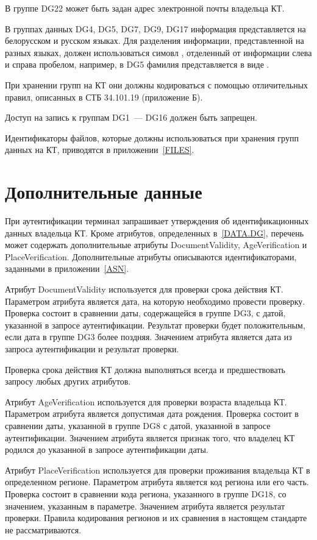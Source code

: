 В группе DG22 может быть задан адрес электронной 
почты владельца КТ. 

В группах данных DG4, DG5, DG7, DG9, DG17 информация
представляется на белорусском и русском языках.
Для разделения информации, представленной на разных языках,
должен использоваться симовл \str{/}, отделенный от информации 
слева и справа пробелом, например, в DG5 фамилия 
представляется в виде .

При хранении групп на КТ они должны кодироваться с помощью отличительных 
правил, описанных в СТБ 34.101.19 (приложение Б). 

Доступ на запись к группам DG1~--- DG16 должен быть запрещен.
 
Идентификаторы файлов, которые
должны использоваться при хранения групп данных на КТ,
приводятся в приложении~\ref{FILES}.

\section{Дополнительные данные}\label{DATA.Optional}

При аутентификации терминал запрашивает утверждения об идентификационных
данных владельца КТ. Кроме атрибутов, определенных в~\ref{DATA.DG}, 
перечень может содержать дополнительные атрибуты DocumentValidity, 
AgeVerification и PlaceVerification. Дополнительные атрибуты описываются 
идентификаторами, заданными в приложении~\ref{ASN}. 

Атрибут DocumentValidity используется для проверки срока действия КТ. 
Параметром атрибута является дата, на которую необходимо провести 
проверку. Проверка состоит в сравнении даты, содержащейся в группе DG3, с 
датой, указанной в запросе аутентификации. Результат проверки будет 
положительным, если дата в группе DG3 более поздняя. Значением атрибута 
является дата из запроса аутентификации и результат проверки. 

Проверка срока действия КТ должна выполняться всегда и предшествовать 
запросу любых других атрибутов. 

Атрибут AgeVerification используется для проверки возраста владельца КТ. 
Параметром атрибута является допустимая дата рождения. Проверка состоит в 
сравнении даты, указанной в группе DG8 с датой, указанной в запросе 
аутентификации. Значением атрибута является признак того, что владелец КТ 
родился до указанной в запросе аутентификации даты. 

Атрибут PlaceVerification используется для проверки проживания владельца 
КТ в определенном регионе. Параметром атрибута является код региона или 
его часть. Проверка состоит в сравнении кода региона, указанного в группе 
DG18, со значением, указанным в параметре. Значением атрибута является 
результат проверки. Правила кодирования регионов и их сравнения в 
настоящем стандарте не рассматриваются. 

